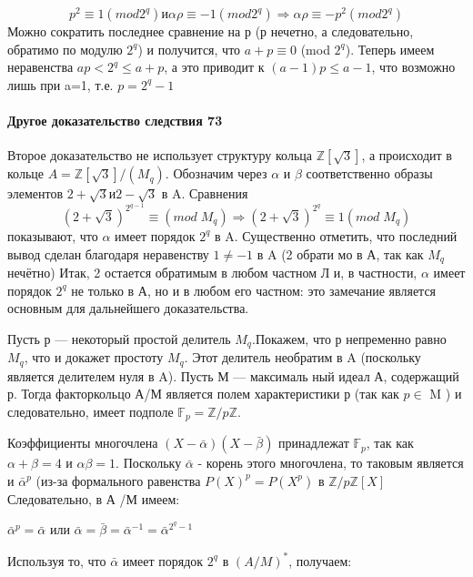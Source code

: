 		\begin{myproof}
		\begin{equation}
		p^2\equiv1(mod 2^q) и \alpha\rho\equiv-1 (mod 2^q) \Rightarrow \alpha\rho\equiv-p^2 (mod 2^q)
		\end{equation}
		Можно сократить последнее сравнение на р (р нечетно, а следовательно, обратимо по модулю $2^q$) и получится, что $a+p \equiv0$ (mod $2^q$). Теперь имеем неравенства $ap<2^q\leqslant a+p$, а это приводит к $(a-1)p \leqslant a -1$, что возможно лишь при a=1, т.е. $p=2^q-1$
	\end{myproof}

	\paragraph{Другое доказательство следствия 73}
	\noindent
	
	Второе доказательство не использует структуру кольца $\mathbb Z[\sqrt{3}]$, а	происходит в кольце $A =\mathbb Z[\sqrt{3}] /(M_q).$ Обозначим через $\alpha$ и $\beta$ соответственно образы элементов $2+\sqrt{3} и 2-\sqrt{3}$ в A. Сравнения \\
	\begin{equation}
	(2+\sqrt{3})^{2^{q-1}} \equiv (mod\;M_q) \Rightarrow (2+\sqrt{3})^{2^q} \equiv 1 (mod\;M_q)
	\end{equation}
	показывают, что $\alpha$ имеет порядок $2^q$ в A. Существенно отметить, что последний вывод сделан благодаря неравенству $1\neq-1$ в A  (2 обрати­
	мо в А, так как $M_q$ нечётно) Итак, 2 остается обратимым в любом частном Л и, в частности, $\alpha$  имеет порядок $2^q$ не только в А, но и в любом его частном: это замечание является основным для дальнейшего	доказательства.
	
	Пусть р — некоторый простой делитель $M_q$.Покажем, что р непременно равно $M_q$, что и докажет простоту $M_q$. Этот делитель необратим	в A (поскольку является делителем нуля в A). Пусть М  — максималь­
	ный идеал А, содержащий р. Тогда факторкольцо А/М является полем	характеристики р (так как $p \in$ M ) и
	следовательно, имеет подполе $\mathbb F_p = \mathbb Z/p \mathbb Z$.
	
	Коэффициенты многочлена $(X-\bar\alpha)(X-\bar\beta)$ принадлежат $\mathbb F_p$, так как  $\alpha+\beta = 4$ и $\alpha\beta=1$. Поскольку $\bar\alpha$ - корень этого многочлена, то таковым является и $\bar\alpha^p$ (из-за формального равенства $P(X)^p = P(X^p)$ в $\mathbb Z/p \mathbb Z[X]$ Следовательно, в А /М имеем:
	

	\begin{center}
		$\bar{\alpha}^p = \bar{\alpha}$ или 
		$\bar{\alpha}=\bar{\beta}=\bar{\alpha}^{-1}=\bar{\alpha}^{2^q-1}$
	\end{center}
	 Используя то, что $\bar{\alpha}$ имеет порядок $2^q$ в  $(A/M)^{*}$, получаем:
	 
